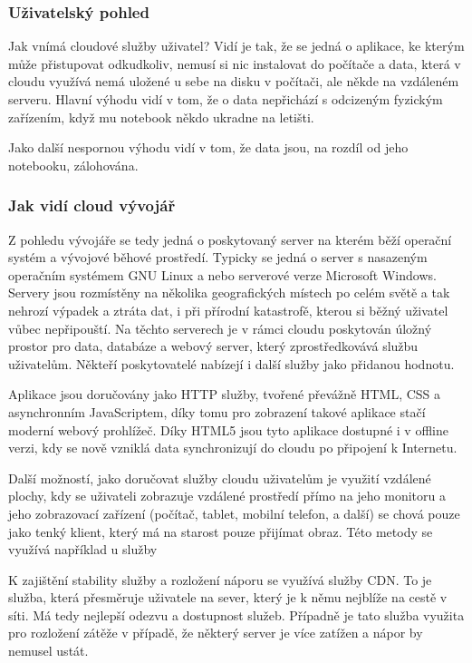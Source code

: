 \subsubsection{Uživatelský pohled}
Jak vnímá cloudové služby uživatel? Vidí je tak, že se jedná o aplikace, ke kterým může přistupovat odkudkoliv, nemusí si nic instalovat do počítače a data, která v cloudu využívá nemá uložené u sebe na disku v počítači, ale někde na vzdáleném serveru. Hlavní výhodu vidí v tom, že o data nepřichází s odcizeným fyzickým zařízením, když mu notebook někdo ukradne na letišti.

Jako další nespornou výhodu vidí v tom, že data jsou, na rozdíl od jeho notebooku, zálohována.

\subsubsection{Jak vidí cloud vývojář}
Z pohledu vývojáře se tedy jedná o poskytovaný server na kterém běží operační systém a vývojové běhové prostředí. Typicky se jedná o server s nasazeným operačním systémem GNU Linux a nebo serverové verze Microsoft Windows. Servery jsou rozmístěny na několika geografických místech po celém světě a tak nehrozí výpadek a ztráta dat, i při přírodní katastrofě, kterou si běžný uživatel vůbec nepřipouští. Na těchto serverech je v rámci cloudu poskytován úložný prostor pro data, databáze a webový server, který zprostředkovává službu uživatelům. Někteří poskytovatelé nabízejí i další služby jako přidanou hodnotu.

Aplikace jsou doručovány jako HTTP služby, tvořené převážně HTML, CSS a asynchronním JavaScriptem, díky tomu pro zobrazení takové aplikace stačí moderní webový prohlížeč. Díky HTML5 jsou tyto aplikace dostupné i v offline verzi, kdy se nově vzniklá data synchronizují do cloudu po připojení k Internetu.

Další možností, jako doručovat služby cloudu uživatelům je využití vzdálené plochy, kdy se uživateli zobrazuje vzdálené prostředí přímo na jeho monitoru a jeho zobrazovací zařízení (počítač, tablet, mobilní telefon, a další) se chová pouze jako tenký klient, který má na starost pouze přijímat obraz. Této metody se využívá například u služby 

K zajištění stability služby a rozložení náporu se využívá služby CDN. To je služba, která přesměruje uživatele na sever, který je k němu nejblíže na cestě v síti. Má tedy nejlepší odezvu a dostupnost služeb. Případně je tato služba využita pro rozložení zátěže v případě, že některý server je více zatížen a nápor by nemusel ustát.

